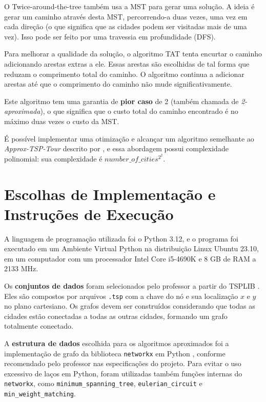 O Twice-around-the-tree também usa a MST para gerar uma solução. A ideia é gerar um caminho 
através desta MST, percorrendo-a duas vezes, uma vez em cada direção (o que significa que as cidades 
podem ser visitadas mais de uma vez). Isso pode ser feito por uma travessia em profundidade (DFS).

Para melhorar a qualidade da solução, o algoritmo TAT tenta encurtar o 
caminho adicionando arestas extras a ele. Essas arestas são escolhidas de tal forma que reduzam 
o comprimento total do caminho. O algoritmo continua a adicionar arestas até que o comprimento 
do caminho não mude significativamente.

Este algoritmo tem uma garantia de \textbf{pior caso} de 2 (também chamada de \textit{2-aproximada}), o que significa 
que o custo total do caminho encontrado é no máximo duas vezes o custo da MST.

É possível implementar uma otimização e alcançar um algoritmo semelhante ao \textit{Approx-TSP-Tour} 
descrito por \cite{cormen}, e essa abordagem possui complexidade polinomial: sua complexidade é $number\_of\_cities^2^2$.


\section{Escolhas de Implementação e Instruções de Execução} \label{sec:implementation}

A linguagem de programação utilizada foi o Python 3.12, e o programa foi executado 
em um Ambiente Virtual Python na distribuição Linux Ubuntu 23.10, em um computador com um 
processador Intel Core i5-4690K e 8 GB de RAM a 2133 MHz.

Os \textbf{conjuntos de dados} foram selecionados pelo professor a partir do TSPLIB \cite{dataset_lib}. Eles são 
compostos por arquivos \texttt{.tsp} com a chave do nó e sua localização $x$ e $y$ no plano cartesiano. 
Os grafos devem ser construídos considerando que todas as cidades estão conectadas a todas as outras cidades, formando 
um grafo totalmente conectado.

A \textbf{estrutura de dados} escolhida para os algoritmos aproximados foi a implementação de grafo 
da biblioteca \texttt{networkx} em Python \cite{networkx_docs}, conforme recomendado pelo 
professor nas especificações do projeto. Para evitar o uso excessivo de laços em Python, 
foram utilizadas também funções internas do \texttt{networkx}, como \texttt{minimum\_spanning\_tree}, 
\texttt{eulerian\_circuit} e \texttt{min\_weight\_matching}.

